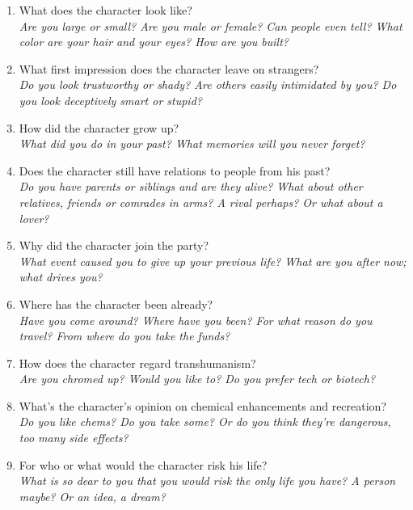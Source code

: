 \documentclass[12pt,a4paper,openany,usenames,dvipsnames]{book}
\begin{document}
	\begin{enumerate}
		\setlength\itemsep{-6mm}
		\item What does the character look like?\\
			\textit{Are you large or small?
				Are you male or female?
				Can people even tell?
				What color are your hair and your eyes?
				How are you built?}
		\item What first impression does the character leave on strangers?\\
			\textit{Do you look trustworthy or shady? Are others easily intimidated by you? Do you look deceptively smart or stupid?}
		\item How did the character grow up?\\
			\textit{What did you do in your past? What memories will you never forget?}
		\item Does the character still have relations to people from his past?\\
			\textit{Do you have parents or siblings and are they alive? What about other relatives, friends or comrades in arms? A rival perhaps? Or what about a lover?}
		\item Why did the character join the party?\\
			\textit{What event caused you to give up your previous life? What are you after now; what drives you?}
		\item Where has the character been already?\\
			\textit{Have you come around?
				Where have you been?
				For what reason do you travel?
				From where do you take the funds?}
		\item How does the character regard transhumanism?\\
			\textit{Are you chromed up? Would you like to? Do you prefer tech or biotech?}
		\item What’s the character’s opinion on chemical enhancements and recreation?\\
			\textit{Do you like chems? Do you take some? Or do you think they're dangerous, too many side effects?}
		\item For who or what would the character risk his life?\\
			\textit{What is so dear to you that you would risk the only life you have? A person maybe? Or an idea, a dream?}

\end{enumerate}
\end{document}
